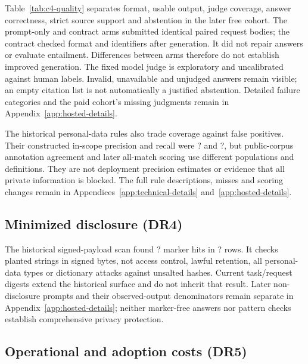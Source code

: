 \documentclass[11pt]{article}
\newcommand{\PiiInPrecision}{?}
\newcommand{\PiiInRecall}{?}
\newcommand{\LeakRows}{?}
\newcommand{\LeakHits}{?}
\begin{document}
Table~\ref{tab:c4-quality} separates format, usable output, judge coverage, answer correctness, strict source support and abstention in the later free cohort. The prompt-only and contract arms submitted identical paired request bodies; the contract checked format and identifiers after generation. It did not repair answers or evaluate entailment. Differences between arms therefore do not establish improved generation. The fixed model judge is exploratory and uncalibrated against human labels. Invalid, unavailable and unjudged answers remain visible; an empty citation list is not automatically a justified abstention. Detailed failure categories and the paid cohort's missing judgments remain in Appendix~\ref{app:hosted-details}.

The historical personal-data rules also trade coverage against false positives. Their constructed in-scope precision and recall were \PiiInPrecision{} and \PiiInRecall{}, but public-corpus annotation agreement and later all-match scoring use different populations and definitions. They are not deployment precision estimates or evidence that all private information is blocked. The full rule descriptions, misses and scoring changes remain in Appendices~\ref{app:technical-details} and~\ref{app:hosted-details}.

\CfourQualityTable
\FloatBarrier

\subsection{Minimized disclosure (DR4)}\label{sec:eval-min}

The historical signed-payload scan found \LeakHits{} marker hits in \LeakRows{} rows. It checks planted strings in signed bytes, not access control, lawful retention, all personal-data types or dictionary attacks against unsalted hashes. Current task/request digests extend the historical surface and do not inherit that result. Later non-disclosure prompts and their observed-output denominators remain separate in Appendix~\ref{app:hosted-details}; neither marker-free answers nor pattern checks establish comprehensive privacy protection.

\subsection{Operational and adoption costs (DR5)}\label{sec:eval-cost}
\end{document}
